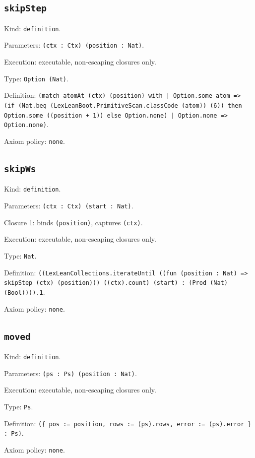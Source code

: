 \documentclass[11pt]{article}
\begin{document}
\subsection*{\texttt{skipStep}}
\noindent Kind: \texttt{definition}.\par
\noindent Parameters: \texttt{(ctx : Ctx) (position : Nat)}.\par
\noindent Execution: executable, non-escaping closures only.\par
\noindent Type: \texttt{Option (Nat)}.\par
\noindent Definition: \texttt{(match atomAt (ctx) (position) with | Option.some atom => (if (Nat.beq (LexLeanBoot.PrimitiveScan.classCode (atom)) (6)) then Option.some ((position + 1)) else Option.none) | Option.none => Option.none)}.\par
\noindent Axiom policy: \texttt{none}.\par
\subsection*{\texttt{skipWs}}
\noindent Kind: \texttt{definition}.\par
\noindent Parameters: \texttt{(ctx : Ctx) (start : Nat)}.\par
\noindent Closure 1: binds \texttt{(position)}, captures \texttt{(ctx)}.\par
\noindent Execution: executable, non-escaping closures only.\par
\noindent Type: \texttt{Nat}.\par
\noindent Definition: \texttt{((LexLeanCollections.iterateUntil ((fun (position : Nat) => skipStep (ctx) (position))) ((ctx).count) (start) : (Prod (Nat) (Bool)))).1}.\par
\noindent Axiom policy: \texttt{none}.\par
\subsection*{\texttt{moved}}
\noindent Kind: \texttt{definition}.\par
\noindent Parameters: \texttt{(ps : Ps) (position : Nat)}.\par
\noindent Execution: executable, non-escaping closures only.\par
\noindent Type: \texttt{Ps}.\par
\noindent Definition: \texttt{(\{ pos := position, rows := (ps).rows, error := (ps).error \} : Ps)}.\par
\noindent Axiom policy: \texttt{none}.\par
\end{document}
